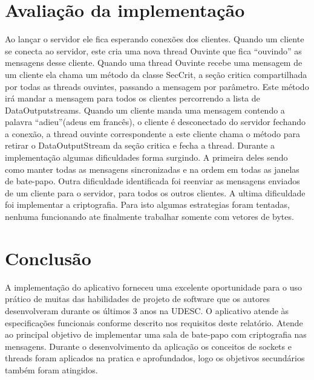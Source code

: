 \documentclass[a4paper,12pt]{article}
\begin{document}
\section{Avaliação da implementação}
Ao lançar o servidor ele fica esperando conexões dos clientes. Quando um cliente se conecta ao servidor, este cria uma nova thread Ouvinte que fica “ouvindo” as mensagens desse cliente. 
Quando uma thread Ouvinte recebe uma mensagem de um cliente ela chama um método da classe SecCrit, a seção critica compartilhada por todas as threads ouvintes, passando a mensagem por parâmetro. Este método irá mandar a mensagem para todos os clientes percorrendo a lista de DataOutputstreams.
Quando um cliente manda uma mensagem contendo a palavra “adieu”(adeus em francês), o cliente é desconectado do servidor fechando a conexão, a thread ouvinte correspondente a este cliente chama o método para retirar o DataOutputStream da seção critica e fecha a thread.
Durante a implementação algumas dificuldades forma surgindo. A primeira deles sendo como manter todas as mensagens sincronizadas e na ordem em todas as janelas de bate-papo.
Outra dificuldade identificada foi reenviar as mensagens enviados de um cliente para o servidor, para todos os outros clientes.
A ultima dificuldade foi implementar a criptografia. Para isto algumas estrategias foram tentadas, nenhuma funcionando ate finalmente trabalhar somente com vetores de bytes.
\section{Conclusão}

A implementação do aplicativo forneceu uma excelente oportunidade para o uso prático de muitas das habilidades de projeto de software que os autores desenvolveram durante os últimos 3 anos na UDESC. O aplicativo atende às especificações funcionais conforme descrito nos requisitos deste relatório.
Atende ao principal objetivo de implementar uma sala de bate-papo com criptografia nas mensagens. Durante o desenvolvimento da aplicação os conceitos de sockets e threads foram aplicados na pratica e aprofundados, logo os objetivos secundários também foram atingidos.
%
%
\end{document}
